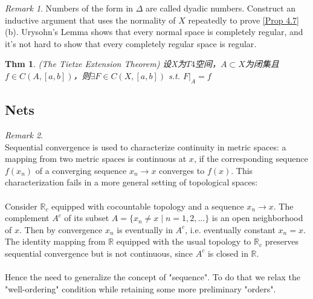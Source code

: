 \documentclass[hidelinks]{article}
\theoremstyle{definition}
\theoremstyle{plain}
\newtheorem{theorem}{Thm}[section]
\theoremstyle{remark}
\newtheorem*{remark}{Remark}
\begin{document}
\begin{remark}
Numbers of the form in $\Delta$ are called dyadic numbers. Construct an inductive argument that uses the normality of $X$ repeatedly to prove \autoref{Prop 4.7} (b). Urysohn's Lemma shows that every normal space is completely regular, and it's not hard to show that every completely regular space is regular.
\end{remark}

\begin{theorem} (The Tietze Extension Theorem) \newline
设X为$T4$空间，$A\subset X$为闭集且$f\in C(A,[a,b])$，则$\exists F\in C(X,[a,b])$ s.t. $\left.F\right|_A=f$
\end{theorem}



\subsection{Nets}
\begin{remark}~\\
Sequential convergence is used to characterize continuity in metric spaces: a mapping from two metric spaces is continuous at $x$, if the corresponding sequence $f(x_n)$ of a converging sequence $x_n\to x$ converges to $f(x)$. This characterization fails in a more general setting of topological spaces:\\
 \\
Consider $\mathbb{R}_c$ equipped with cocountable topology and a sequence $x_n\to x$. The complement $A^c$ of its subset $A=\{x_n\neq x\mid n=1,2,...\}$ is an open neighborhood of $x$. Then by convergence $x_n$ is eventually in $A^c$, i.e. eventually constant $x_n=x$. The identity mapping from $\mathbb{R}$ equipped with the usual topology to $\mathbb{R}_c$ preserves sequential convergence but is not continuous, since $A^c$ is closed in $\mathbb{R}$. \\
 \\
Hence the need to generalize the concept of "sequence". To do that we relax the "well-ordering" condition while retaining some more preliminary "orders". 
\end{remark}
\end{document}
